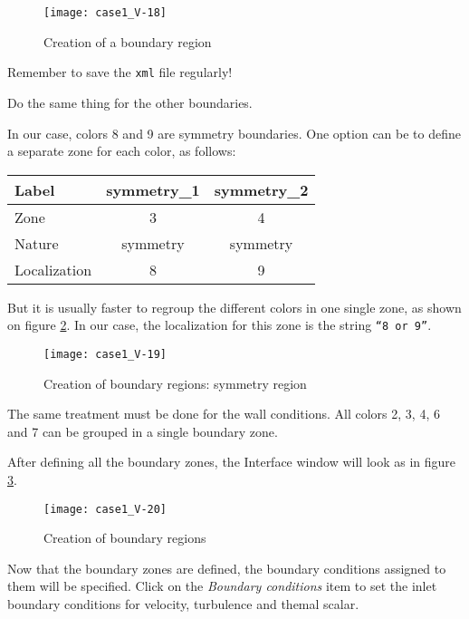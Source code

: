 \begin{figure}[ht]
\begin{center}
\texttt{[image: case1\_V-18]}
\caption{Creation of a boundary region}
\label{fig20_e1}
\end{center}
\end{figure}

Remember to save the \texttt{xml} file regularly!


\clearpage
Do the same thing for the other boundaries.

In our case, colors 8 and 9 are symmetry boundaries. One option can be to define
a separate zone for each color, as follows:
\begin{center}
\begin{tabular}{|l|c||c|}
\hline
Label & symmetry\_1 & symmetry\_2 \\
\hline
\hline
Zone & 3 & 4 \\
\hline
Nature & symmetry & symmetry \\
\hline
Localization & 8  & 9 \\
\hline
\end{tabular}
\end{center}

But it is usually faster to regroup the different colors in one single zone, as
shown on figure \ref{fig24_e1}. In our case, the localization for this zone is
the string \texttt{``8 or 9''}.

\begin{figure}[ht]
\begin{center}
\texttt{[image: case1\_V-19]}
\caption{Creation of boundary regions: symmetry region}
\label{fig24_e1}
\end{center}
\end{figure}


\clearpage
The same treatment must be done for the wall conditions. All colors 2, 3, 4, 6
and 7 can be grouped in a single boundary zone.

After defining all the boundary zones, the Interface window will look as in
figure \ref{fig25_e1}.

\begin{figure}[ht]
\begin{center}
\texttt{[image: case1\_V-20]}
\caption{Creation of boundary regions}
\label{fig25_e1}
\end{center}
\end{figure}


\clearpage
Now that the boundary zones are defined, the boundary conditions assigned to
them will be specified. Click on the {\itshape Boundary conditions} item to
set the inlet boundary conditions for velocity, turbulence and themal scalar.

